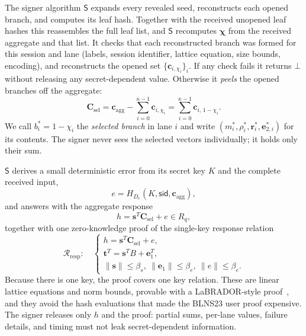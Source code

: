 \documentclass[11pt]{article}
\newcommand{\R}{R_q}
\renewcommand{\S}{\mathsf{S}}
\begin{document}
The signer algorithm $\S$ expands every revealed seed, reconstructs each
opened branch, and computes its leaf hash.  Together with the received
unopened leaf hashes this reassembles the full leaf list, and $\S$
recomputes $\boldsymbol\chi$ from the received aggregate and that list.  It
checks that each reconstructed branch was formed for this session and lane
(labels, session identifier, lattice equation, size bounds, encoding), and
reconstructs the opened set $\{\mathbf c_{i,\chi_i}\}_i$.  If any check fails
it returns $\bot$ without releasing any secret-dependent value.  Otherwise it
\emph{peels} the opened branches off the aggregate:
\[
 \mathbf C_{\mathrm{sel}}
 =\mathbf c_{\mathrm{agg}}-\sum_{i=0}^{\kappa-1}\mathbf c_{i,\chi_i}
 =\sum_{i=0}^{\kappa-1}\mathbf c_{i,\,1-\chi_i}.
\]
We call $b_i^*=1-\chi_i$ the \emph{selected branch} in lane $i$ and write
$(m_i^*,\rho_i^*,\mathbf r_i^*,\mathbf e_{2,i}^*)$ for its contents.
The signer never sees the selected vectors individually; it holds only their
sum.

$\S$ derives a small deterministic error from its secret key $K$ and the
complete received input,
\[
 e=H_{D_e}(K,\mathsf{sid},\mathbf c_{\mathrm{agg}}),
\]
and answers with the aggregate response
\[
 h=\mathbf s^{T}\mathbf C_{\mathrm{sel}}+e\in\R,
\]
together with one zero-knowledge proof of the single-key response relation
\[
 \mathcal R_{\mathrm{resp}}:\quad
 \begin{cases}
  h=\mathbf s^{T}\mathbf C_{\mathrm{sel}}+e,\\
  \mathbf t^{T}=\mathbf s^{T}B+\mathbf e_{1}^{T},\\
  \|\mathbf s\|\leq\beta_s,\ \|\mathbf e_1\|\leq\beta_e,\ \|e\|\leq\beta_e.
 \end{cases}
\]
Because there is one key, the proof covers one key relation.  These are linear
lattice equations and norm bounds, provable with a LaBRADOR-style
proof~\cite{BS22}, and they avoid the hash evaluations that made the BLNS23
user proof expensive.  The signer releases only $h$ and the proof: partial
sums, per-lane values, failure details, and timing must not leak
secret-dependent information.
\end{document}
